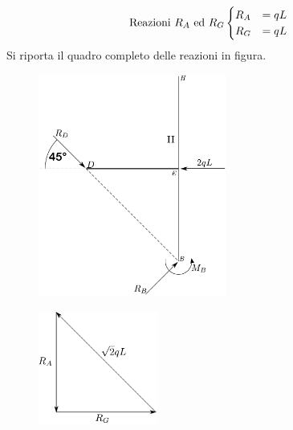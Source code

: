 \begin{equation*}
\text{Reazioni } R_{A} \text{ ed } R_{G}
\begin{cases}
R_{A} &=  qL           \notag \\
R_{G} &= qL  \notag 
\end{cases}
\end{equation*}
Si riporta il quadro completo delle reazioni in figura. 
\renewcommand{\thefigure}{12.2~-~2}
\begin{figure}[ht]
\centering
\includegraphics[width=0.55\textwidth]{Immagini/Parte_12/Esercizio12_2/12_2_2.pdf}
\caption{}
\label{Esercizio12-2-2}
\end{figure}
\renewcommand{\thefigure}{12.2~-~3}
\begin{figure}[ht]
\centering
\includegraphics[width=0.35\textwidth]{Immagini/Parte_12/Esercizio12_2/12_2_3.pdf}
\caption{}
\label{Esercizio12-2-3}
\end{figure}
